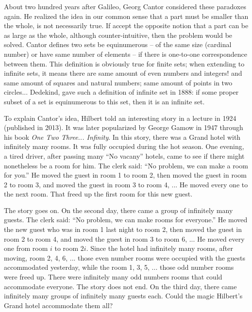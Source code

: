 \documentclass[b5paper]{article}
\begin{document}
 
About two hundred years after Galileo, Georg Cantor considered these paradoxes again. He realized the idea in our common sense that a part must be smaller than the whole, is not necessarily true. If accept the opposite notion that a part can be as large as the whole, although counter-intuitive, then the problem would be solved. Cantor defines two sets be equinumerous -- of the same size (cardinal number) or have same number of elements -- if there is one-to-one correspondence between them. This definition is obviously true for finite sets; when extending to infinite sets, it means there are same amount of even numbers and integers! and same amount of squares and natural numbers; same amount of points in two circles... Dedekind, gave such a definition of infinite set in 1888: if some proper subset of a set is equinumerous to this set, then it is an infinite set\cite{Dedekind-1858}.

To explain Cantor's idea, Hilbert told an interesting story in a lecture in 1924 (published in 2013). It was later popularized by George Gamow in 1947 through his book \emph{One Two Three... Infinity}. In this story, there was a Grand hotel with infinitely many rooms. It was fully occupied during the hot season. One evening, a tired driver, after passing many \enquote{No vacany} hotels, came to see if there might nonetheless be a room for him. The clerk said: \enquote{No problem, we can make a room for you.} He moved the guest in room 1 to room 2, then moved the guest in room 2 to room 3, and moved the guest in room 3 to room 4, ... He moved every one to the next room. That freed up the first room for this new guest.

The story goes on. On the second day, there came a group of infinitely many guests. The clerk said: \enquote{No problem, we can make rooms for everyone.} He moved the new guest who was in room 1 last night to room 2, then moved the guest in room 2 to room 4, and moved the guest in room 3 to room 6, ... He moved every one from room $i$ to room $2i$. Since the hotel had infinitely many rooms, after moving, room 2, 4, 6, ... those even number rooms were occupied with the guests accommodated yesterday, while the room 1, 3, 5, ... those odd number rooms were freed up. There were infinitely many odd numbers rooms that could accommodate everyone. The story does not end. On the third day, there came infinitely many groups of infinitely many guests each. Could the magic Hilbert's Grand hotel accommodate them all?
\end{document}
